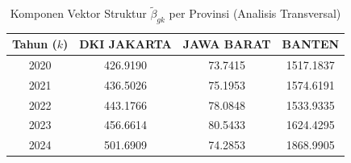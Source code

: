 \begin{table}[H]
\centering
\small
\caption{Komponen Vektor Struktur $\tilde{\beta}_{gk}$ per Provinsi (Analisis Transversal)} \label{tab:app2beta_provinsi}
\begin{tabular}{|c|c|c|c|}
\hline
\textbf{Tahun ($k$)} & \textbf{DKI JAKARTA} & \textbf{JAWA BARAT} & \textbf{BANTEN} \\
\hline
2020 & 426.9190 & 73.7415 & 1517.1837 \\
2021 & 436.5026 & 75.1953 & 1574.6191 \\
2022 & 443.1766 & 78.0848 & 1533.9335 \\
2023 & 456.6614 & 80.5433 & 1624.4295 \\
2024 & 501.6909 & 74.2853 & 1868.9905 \\
\hline
\end{tabular}
\end{table}